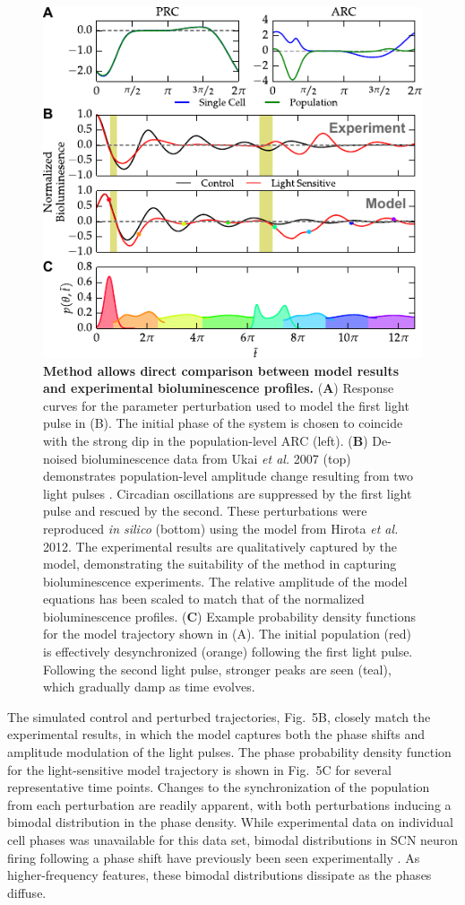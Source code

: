 \documentclass[11pt, letterpaper]{article}
\begin{document}
\begin{figure}[tbp]
  \begin{center}
    \includegraphics[width=.75\textwidth]{figures/figure_5.pdf}
    \caption{
{\bfseries Method allows direct comparison between model results and experimental bioluminescence profiles.} 
({\bfseries A}) Response curves for the parameter perturbation used to model the first light pulse in (B).
The initial phase of the system is chosen to coincide with the strong dip in the population-level ARC (left).
({\bfseries B}) De-noised bioluminescence data from Ukai {\itshape et al.} 2007 (top) demonstrates population-level amplitude change resulting from two light pulses \cite{Ukai2007}.
Circadian oscillations are suppressed by the first light pulse and rescued by the second.
These perturbations were reproduced {\itshape in silico} (bottom) using the model from Hirota {\itshape et al.} 2012.
The experimental results are qualitatively captured by the model, demonstrating the suitability of the method in capturing bioluminescence experiments.
The relative amplitude of the model equations has been scaled to match that of the normalized bioluminescence profiles.
({\bfseries C}) Example probability density functions for the model trajectory shown in (A).
 The initial population (red) is effectively desynchronized (orange) following the first light pulse.
Following the second light pulse, stronger peaks are seen (teal), which gradually damp as time evolves.} \end{center}
\end{figure}

The simulated control and perturbed trajectories, Fig.~5B, closely match the experimental results, in which the model captures both the phase shifts and amplitude modulation of the light pulses.
The phase probability density function for the light-sensitive model trajectory is shown in Fig.~5C for several representative time points.
Changes to the synchronization of the population from each perturbation are readily apparent, with both perturbations inducing a bimodal distribution in the phase density.
While experimental data on individual cell phases was unavailable for this data set, bimodal distributions in SCN neuron firing following a phase shift have previously been seen experimentally \cite{Rohling2011}.
As higher-frequency features, these bimodal distributions dissipate as the phases diffuse.
\end{document}
